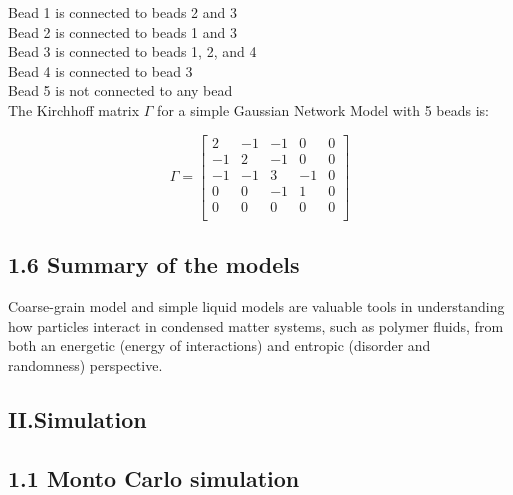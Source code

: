 \documentclass[12pt]{article}
\begin{document}
\begin{flushleft}
Bead 1 is connected to beads 2 and 3\\

Bead 2 is connected to beads 1 and 3\\

Bead 3 is connected to beads 1, 2, and 4\\

Bead 4 is connected to bead 3\\

Bead 5 is not connected to any bead\\

The Kirchhoff matrix \( \Gamma \) for a simple Gaussian Network Model with 5 beads is:

\[
\Gamma =
\begin{bmatrix}
  2 & -1 & -1 & 0 & 0 \\
 -1 &  2 & -1 & 0 & 0 \\
 -1 & -1 & 3 & -1 & 0 \\
  0 &  0 & -1 & 1 & 0 \\
  0 &  0 &  0 & 0 & 0 \\
\end{bmatrix}
\]








\subsection*{1.6 Summary of the models}
Coarse-grain model and simple liquid models are valuable tools in understanding how particles interact in condensed matter systems, such as polymer fluids, from both an energetic (energy of interactions) and entropic (disorder and randomness) perspective.


\subsection*{II.Simulation}


\subsection*{1.1 Monto Carlo simulation}


\end{flushleft}
\end{document}
